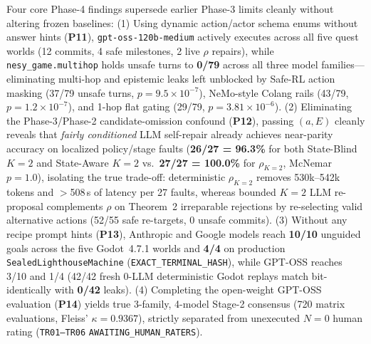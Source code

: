 Four core Phase-4 findings supersede earlier Phase-3 limits cleanly without altering frozen baselines:
(1) Using dynamic action/actor schema enums without answer hints (\textbf{P11}), \texttt{gpt-oss-120b-medium} actively executes across all five quest worlds (12 commits, 4 safe milestones, 2 live $\rho$ repairs), while \texttt{nesy\_game.multihop} holds unsafe turns to \textbf{0/79} across all three model families---eliminating multi-hop and epistemic leaks left unblocked by Safe-RL action masking (37/79 unsafe turns, $p{=}9.5{\times}10^{-7}$), NeMo-style Colang rails (43/79, $p{=}1.2{\times}10^{-7}$), and 1-hop flat gating (29/79, $p{=}3.81{\times}10^{-6}$).
(2) Eliminating the Phase-3/Phase-2 candidate-omission confound (\textbf{P12}), passing $(a, E)$ cleanly reveals that \emph{fairly conditioned} LLM self-repair already achieves near-parity accuracy on localized policy/stage faults (\textbf{26/27 = 96.3\%} for both State-Blind $K{=}2$ and State-Aware $K{=}2$ vs.\ \textbf{27/27 = 100.0\%} for $\rho_{K=2}$, McNemar $p{=}1.0$), isolating the true trade-off: deterministic $\rho_{K=2}$ removes 530k--542k tokens and $>$508\,s of latency per 27 faults, whereas bounded $K{=}2$ LLM re-proposal complements $\rho$ on Theorem~2 irreparable rejections by re-selecting valid alternative actions (52/55 safe re-targets, 0 unsafe commits).
(3) Without any recipe prompt hints (\textbf{P13}), Anthropic and Google models reach \textbf{10/10} unguided goals across the five Godot~4.7.1 worlds and \textbf{4/4} on production \texttt{SealedLighthouseMachine} (\texttt{EXACT\_TERMINAL\_HASH}), while GPT-OSS reaches 3/10 and 1/4 (42/42 fresh 0-LLM deterministic Godot replays match bit-identically with \textbf{0/42} leaks).
(4) Completing the open-weight GPT-OSS evaluation (\textbf{P14}) yields true 3-family, 4-model Stage-2 consensus (720 matrix evaluations, Fleiss' $\kappa{=}0.9367$), strictly separated from unexecuted $N{=}0$ human rating (\texttt{TR01--TR06} \texttt{AWAITING\_HUMAN\_RATERS}).
